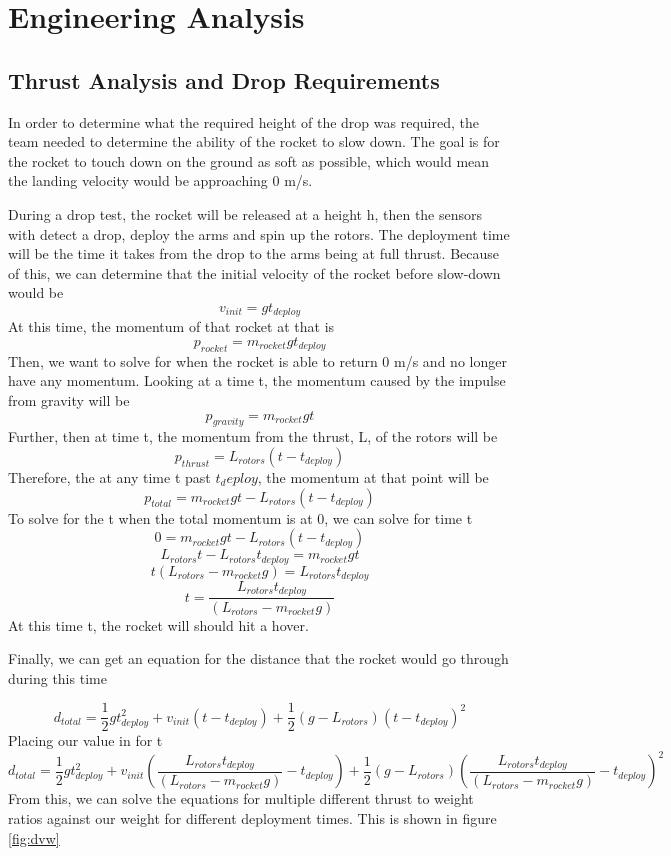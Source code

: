 \chapter{Engineering Analysis}

\section{Thrust Analysis and Drop Requirements}
\label{thrust_analysis}

In order to determine what the required height of the drop was required, the team needed to determine the ability of the rocket to slow down. The goal is for the rocket to touch down on the ground as soft as possible, which would mean the landing velocity would be approaching 0 m/s.

During a drop test, the rocket will be released at a height h, then the sensors with detect a drop, deploy the arms and spin up the rotors. The deployment time will be the time it takes from the drop to the arms being at full thrust. Because of this, we can determine that the initial velocity of the rocket before slow-down would be
\[v_{init} = gt_{deploy}\]
At this time, the momentum of that rocket at that is
\[p_{rocket} = m_{rocket}gt_{deploy}\]
Then, we want to solve for when the rocket is able to return 0 m/s and no longer have any momentum. Looking at a time t, the momentum caused by the impulse from gravity will be
\[p_{gravity} = m_{rocket}gt\]
Further, then at time t, the momentum from the thrust, L, of the rotors will be
\[p_{thrust} = L_{rotors}(t-t_{deploy})\]
Therefore, the at any time t past $t_deploy$, the momentum at that point will be
\[p_{total} = m_{rocket}gt - L_{rotors}(t-t_{deploy})\]
To solve for the t when the total momentum is at 0, we can solve for time t
\[0 = m_{rocket}gt - L_{rotors}(t-t_{deploy})\]
\[L_{rotors}t-L_{rotors}t_{deploy} = m_{rocket}gt\]
\[t(L_{rotors} - m_{rocket}g) = L_{rotors}t_{deploy}\]
\[t = \frac{L_{rotors}t_{deploy}}{(L_{rotors} - m_{rocket}g)}\]
At this time t, the rocket will should hit a hover. 

\noindent Finally, we can get an equation for the distance that the rocket would go through during this time

\[d_{total} = \frac{1}{2}gt_{deploy}^2 + v_{init}(t-t_{deploy}) + \frac{1}{2}(g-L_{rotors})(t-t_{deploy})^2\]
Placing our value in for t
\[d_{total} = \frac{1}{2}gt_{deploy}^2 + v_{init}(\frac{L_{rotors}t_{deploy}}{(L_{rotors} - m_{rocket}g)}-t_{deploy}) + \frac{1}{2}(g-L_{rotors})(\frac{L_{rotors}t_{deploy}}{(L_{rotors} - m_{rocket}g)}-t_{deploy})^2\]
From this, we can solve the equations for multiple different thrust to weight ratios against our weight for different deployment times. This is shown in figure \ref{fig:dvw}

